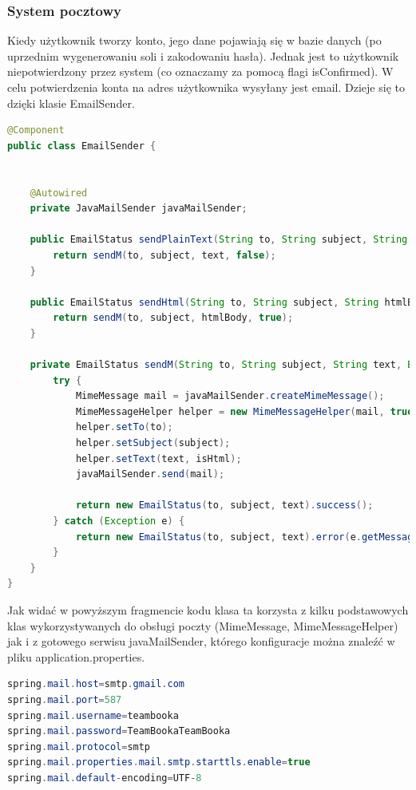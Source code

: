 \documentclass{report}
\begin{document}
			\subsubsection{System pocztowy}
			
Kiedy użytkownik tworzy konto, jego dane pojawiają się w bazie danych (po uprzednim wygenerowaniu soli i zakodowaniu hasła). Jednak jest to użytkownik niepotwierdzony przez system (co oznaczamy za pomocą flagi isConfirmed). W celu potwierdzenia konta na adres użytkownika wysyłany jest email. Dzieje się to dzięki klasie EmailSender.

\begin{lstlisting}[language=Java, breaklines]
@Component
public class EmailSender {


    @Autowired
    private JavaMailSender javaMailSender;

    public EmailStatus sendPlainText(String to, String subject, String text) {
        return sendM(to, subject, text, false);
    }

    public EmailStatus sendHtml(String to, String subject, String htmlBody) {
        return sendM(to, subject, htmlBody, true);
    }

    private EmailStatus sendM(String to, String subject, String text, Boolean isHtml) {
        try {
            MimeMessage mail = javaMailSender.createMimeMessage();
            MimeMessageHelper helper = new MimeMessageHelper(mail, true);
            helper.setTo(to);
            helper.setSubject(subject);
            helper.setText(text, isHtml);
            javaMailSender.send(mail);

            return new EmailStatus(to, subject, text).success();
        } catch (Exception e) {
            return new EmailStatus(to, subject, text).error(e.getMessage());
        }
    }
}
\end{lstlisting}

Jak widać w powyższym fragmencie kodu klasa ta korzysta z kilku podstawowych klas wykorzystywanych do obsługi poczty (MimeMessage, MimeMessageHelper) jak i z gotowego serwisu javaMailSender, którego konfiguracje można znaleźć w pliku application.properties.

\begin{lstlisting}[language=Java, breaklines]
spring.mail.host=smtp.gmail.com
spring.mail.port=587
spring.mail.username=teambooka
spring.mail.password=TeamBookaTeamBooka
spring.mail.protocol=smtp
spring.mail.properties.mail.smtp.starttls.enable=true
spring.mail.default-encoding=UTF-8
\end{lstlisting}
\end{document}

